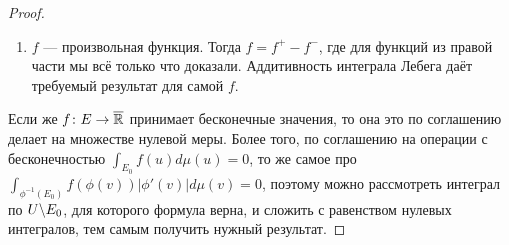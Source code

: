 \begin{proof}
\begin{enumerate}
		\item $f$ --- произвольная функция. Тогда $f = f^+ - f^-$, где для функций из правой части мы всё только что доказали. Аддитивность интеграла Лебега даёт требуемый результат для самой $f$.
	\end{enumerate}

	Если же $f \colon E \to \overline{\mathbb{R}}$ принимает бесконечные значения, то она это по соглашению делает на множестве нулевой меры. Более того, по соглашению на операции с бесконечностью $\int_{E_0} f(u)d\mu(u) = 0$, то же самое про $\int_{\phi^{-1}(E_0)} f(\phi(v))|\phi'(v)|d\mu(v) = 0$, поэтому можно рассмотреть интеграл по $U \backslash E_0$, для которого формула верна, и сложить с равенством нулевых интегралов, тем самым получить нужный результат.
\end{proof}
